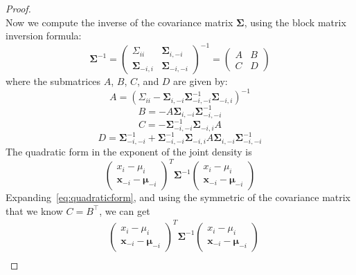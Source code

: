 \begin{proof}
\begin{equation*}
    \end{equation*}
    Now we compute the inverse of the covariance matrix $\boldsymbol{\Sigma}$, using the block matrix inversion formula: 
    \begin{equation*}
        \boldsymbol{\Sigma}^{-1} = \begin{pmatrix} \Sigma_{ii} & \boldsymbol{\Sigma}_{i,-i} \\ \boldsymbol{\Sigma}_{-i,i} & \boldsymbol{\Sigma}_{-i,-i} \end{pmatrix}^{-1} = \begin{pmatrix} A & B \\ C & D \end{pmatrix}
    \end{equation*}
    where the submatrices $A$, $B$, $C$, and $D$ are given by:
    \[
        A = (\Sigma_{ii} - \boldsymbol{\Sigma}_{i,-i} \boldsymbol{\Sigma}_{-i,-i}^{-1} \boldsymbol{\Sigma}_{-i,i})^{-1}
    \]
    \[
        B = -A \boldsymbol{\Sigma}_{i,-i} \boldsymbol{\Sigma}_{-i,-i}^{-1}
    \]
    \[
        C = -\boldsymbol{\Sigma}_{-i,-i}^{-1} \boldsymbol{\Sigma}_{-i,i} A
    \]
    \[
        D = \boldsymbol{\Sigma}_{-i,-i}^{-1} + \boldsymbol{\Sigma}_{-i,-i}^{-1} \boldsymbol{\Sigma}_{-i,i} A \boldsymbol{\Sigma}_{i,-i} \boldsymbol{\Sigma}_{-i,-i}^{-1}
    \]  
    The quadratic form in the exponent of the joint density is
    \begin{equation}\label{eq:quadraticform}
        \begin{pmatrix} x_i - \mu_i \\ \mathbf{x}_{-i} - \boldsymbol{\mu}_{-i} \end{pmatrix}^T \boldsymbol{\Sigma}^{-1} \begin{pmatrix} x_i - \mu_i \\ \mathbf{x}_{-i} - \boldsymbol{\mu}_{-i} \end{pmatrix}
    \end{equation}
    Expanding~\ref{eq:quadraticform}, and using the symmetric of the covariance matrix that we know $C=B^{\top}$, we can get 
    \begin{align*}
        &\begin{pmatrix} x_i - \mu_i \\ \mathbf{x}_{-i} - \boldsymbol{\mu}_{-i} \end{pmatrix}^T \boldsymbol{\Sigma}^{-1} \begin{pmatrix} x_i - \mu_i \\ \mathbf{x}_{-i} - \boldsymbol{\mu}_{-i} \end{pmatrix} \\

\end{align*}
\end{proof}
